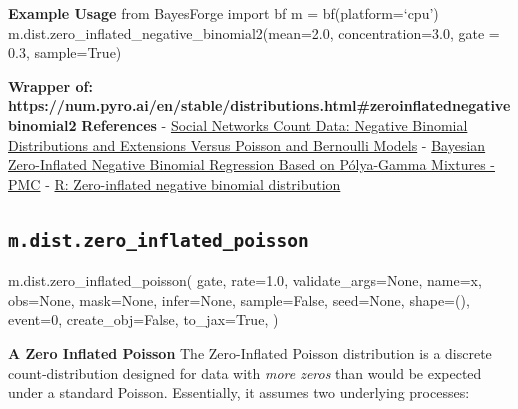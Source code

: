 \documentclass[
  letterpaper,
  DIV=11,
  numbers=noendperiod]{scrartcl}
\newenvironment{Shaded}{\begin{snugshade}}{\end{snugshade}}
\newcommand{\DecValTok}[1]{\textcolor[rgb]{0.68,0.00,0.00}{#1}}
\newcommand{\FloatTok}[1]{\textcolor[rgb]{0.68,0.00,0.00}{#1}}
\newcommand{\NormalTok}[1]{\textcolor[rgb]{0.00,0.23,0.31}{#1}}
\newcommand{\OperatorTok}[1]{\textcolor[rgb]{0.37,0.37,0.37}{#1}}
\newcommand{\StringTok}[1]{\textcolor[rgb]{0.13,0.47,0.30}{#1}}
\newcommand{\VariableTok}[1]{\textcolor[rgb]{0.07,0.07,0.07}{#1}}
\begin{document}
\textbf{Example Usage} from BayesForge import bf m = bf(platform=`cpu')
m.dist.zero\_inflated\_negative\_binomial2(mean=2.0, concentration=3.0,
gate = 0.3, sample=True)

\textbf{Wrapper of:
https://num.pyro.ai/en/stable/distributions.html\#zeroinflatednegativebinomial2}
\textbf{References} -
\href{https://www.ewadirect.com/proceedings/tns/article/view/27624}{Social
Networks Count Data: Negative Binomial Distributions and Extensions
Versus Poisson and Bernoulli Models} -
\href{https://pmc.ncbi.nlm.nih.gov/articles/PMC7880198/}{Bayesian
Zero-Inflated Negative Binomial Regression Based on Pólya-Gamma Mixtures
- PMC} -
\href{https://search.r-project.org/CRAN/refmans/emdbook/html/dzinbinom.html}{R:
Zero-inflated negative binomial distribution}

\subsection{\texorpdfstring{\texttt{m.dist.zero\_inflated\_poisson}}{m.dist.zero\_inflated\_poisson}}\label{zero_inflated_poisson}

\begin{Shaded}
\begin{Highlighting}[]
\NormalTok{m.dist.zero\_inflated\_poisson(}
\NormalTok{    gate,}
\NormalTok{    rate}\OperatorTok{=}\FloatTok{1.0}\NormalTok{,}
\NormalTok{    validate\_args}\OperatorTok{=}\VariableTok{None}\NormalTok{,}
\NormalTok{    name}\OperatorTok{=}\StringTok{\textquotesingle{}x\textquotesingle{}}\NormalTok{,}
\NormalTok{    obs}\OperatorTok{=}\VariableTok{None}\NormalTok{,}
\NormalTok{    mask}\OperatorTok{=}\VariableTok{None}\NormalTok{,}
\NormalTok{    infer}\OperatorTok{=}\VariableTok{None}\NormalTok{,}
\NormalTok{    sample}\OperatorTok{=}\VariableTok{False}\NormalTok{,}
\NormalTok{    seed}\OperatorTok{=}\VariableTok{None}\NormalTok{,}
\NormalTok{    shape}\OperatorTok{=}\NormalTok{(),}
\NormalTok{    event}\OperatorTok{=}\DecValTok{0}\NormalTok{,}
\NormalTok{    create\_obj}\OperatorTok{=}\VariableTok{False}\NormalTok{,}
\NormalTok{    to\_jax}\OperatorTok{=}\VariableTok{True}\NormalTok{,}
\NormalTok{)}
\end{Highlighting}
\end{Shaded}

\textbf{A Zero Inflated Poisson} The Zero-Inflated Poisson distribution
is a discrete count‐distribution designed for data with \emph{more
zeros} than would be expected under a standard Poisson. Essentially, it
assumes two underlying processes:
\end{document}
